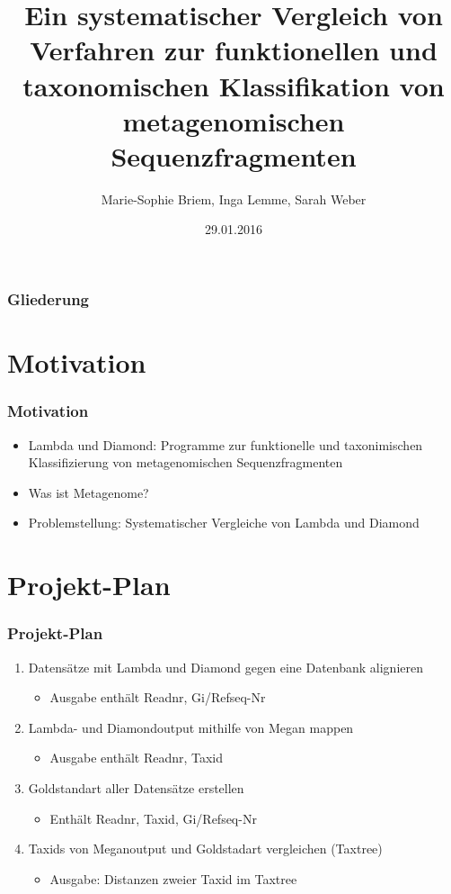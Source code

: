 \documentclass[11pt, ngerman]{beamer}
\author{Marie-Sophie Briem, Inga Lemme, Sarah Weber}
\title{\textrm \textbf{Ein systematischer Vergleich von Verfahren zur funktionellen und
taxonomischen Klassifikation von metagenomischen Sequenzfragmenten}}
\date{29.01.2016}
\institute{Zentrum f\"ur Bioinformatik, Universit\"at Hamburg}
\begin{document}
\begin{frame} %
\titlepage
\end{frame}


\begin{frame} %
\frametitle{Gliederung}
\tableofcontents 
\end{frame} 
 

\section{Motivation} 
\begin{frame} %
\frametitle{Motivation}
\begin{itemize}
\item Lambda und Diamond: Programme zur funktionelle und taxonimischen Klassifizierung von metagenomischen Sequenzfragmenten
\item Was ist Metagenome? 
\item Problemstellung: Systematischer Vergleiche von Lambda und Diamond
\end{itemize}
\end{frame}

\section{Projekt-Plan}
\begin{frame}
\frametitle{Projekt-Plan}
\begin{enumerate}
\item Datens\"atze mit Lambda und Diamond gegen eine Datenbank alignieren
  \begin{itemize}
    \item Ausgabe enth\"alt Readnr, Gi/Refseq-Nr
  \end{itemize}
\item Lambda- und Diamondoutput mithilfe von Megan mappen
  \begin{itemize}
    \item Ausgabe enth\"alt Readnr, Taxid
  \end{itemize}
\item Goldstandart aller Datens\"atze erstellen
  \begin{itemize}
    \item Enth\"alt Readnr, Taxid, Gi/Refseq-Nr
  \end{itemize}
\item Taxids von Meganoutput und Goldstadart vergleichen (Taxtree)
  \begin{itemize}
    \item Ausgabe: Distanzen zweier Taxid im Taxtree
  \end{itemize}
\end{enumerate}
\end{frame}
\end{document}

